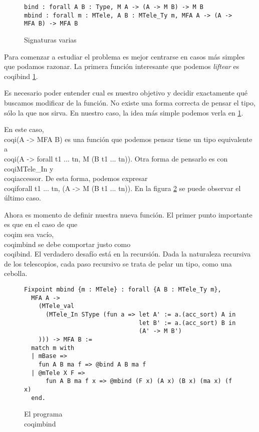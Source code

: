 \begin{figure}[h]
  \centering
  \begin{verbatim}
bind : forall A B : Type, M A -> (A -> M B) -> M B
mbind : forall m : MTele, A B : MTele_Ty m, MFA A -> (A -> MFA B) -> MFA B
  \end{verbatim}
  \caption{Signaturas varias}
  \label{fig:bind}
\end{figure}

Para comenzar a estudiar el problema es mejor centrarse en casos más simples que
podamos razonar. La primera función interesante que podemos \textit{liftear} es
\\coqi{bind} \ref{fig:bind}. 

Es necesario poder entender cual es nuestro objetivo y decidir exactamente qué
buscamos modificar de la función. No existe una forma correcta de pensar el
tipo, sólo la que nos sirva. En nuestro caso, la idea más simple podemos verla
en \ref{fig:bind}.

En este caso, \\coqi{(A -> MFA B)} es una función que podemos pensar tiene un
tipo equivalente a \\coqi{(A -> forall t1 ... tn, M (B t1 ... tn))}. Otra forma
de pensarlo es con \\coqi{MTele_In} y \\coqi{accessor}. De esta forma, podemos
expresar \\coqi{forall t1 ... tn, (A -> M (B t1 ... tn))}. En la figura
\ref{fig:mbind} se puede observar el último caso. 

Ahora es momento de definir nuestra nueva función. El primer punto importante es
que en el caso de que \\coqi{m} sea vacío, \\coqi{mbind} se debe comportar justo
como \\coqi{bind}. El verdadero desafío está en la recursión. Dada la naturaleza
recursiva de los telescopios, cada paso recursivo se trata de pelar un tipo,
como una cebolla.

\begin{figure}[h]
\centering
\begin{verbatim}
Fixpoint mbind {m : MTele} : forall {A B : MTele_Ty m},
  MFA A ->
    (MTele_val
      (MTele_In SType (fun a => let A' := a.(acc_sort) A in
                                let B' := a.(acc_sort) B in
                                (A' -> M B')
    ))) -> MFA B :=
  match m with
  | mBase =>
    fun A B ma f => @bind A B ma f
  | @mTele X F =>
      fun A B ma f x => @mbind (F x) (A x) (B x) (ma x) (f x)
  end.
\end{verbatim}
\caption{El programa \\coqi{mbind}}
\label{fig:mbind}
\end{figure}

